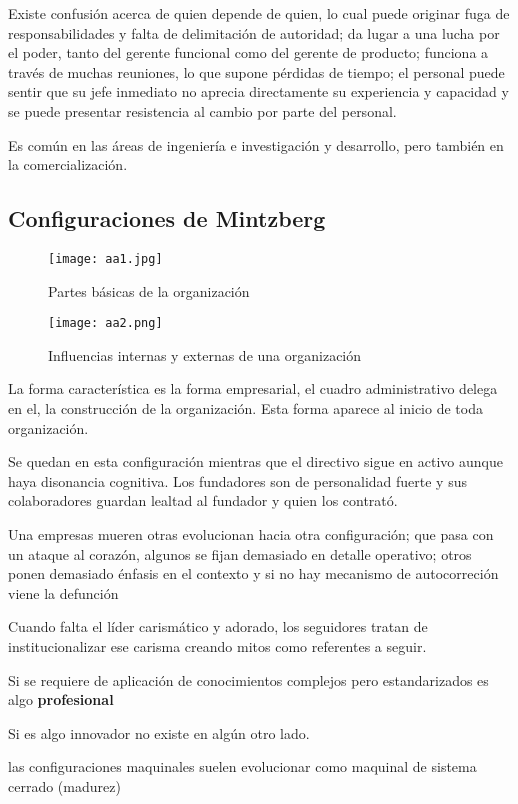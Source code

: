 Existe confusión acerca de quien depende de quien, lo cual puede originar fuga de responsabilidades y falta de delimitación de autoridad; da lugar a una lucha por el poder, tanto del gerente funcional como del gerente de producto; funciona a través de muchas reuniones, lo que supone pérdidas de tiempo; el personal puede sentir que su jefe inmediato no aprecia directamente su experiencia y capacidad y se puede presentar resistencia al cambio por parte del personal.

Es común en las áreas de ingeniería e investigación y desarrollo, pero también en la comercialización.

\subsection{Configuraciones de Mintzberg}
\begin{figure}[h!]
\centering
  \texttt{[image: aa1.jpg]}
  \caption{Partes básicas de la organización}
  \label{aa1jpg}
\end{figure}

\begin{figure}[h!]
\centering
  \texttt{[image: aa2.png]}
  \caption{Influencias internas y externas de una organización}
  \label{aa2}
\end{figure}
La forma característica es la forma empresarial, el cuadro administrativo delega en el, la construcción de la organización. Esta forma aparece al inicio de toda organización. 

Se quedan en esta configuración mientras que el directivo sigue en activo aunque haya disonancia cognitiva. Los fundadores son de personalidad fuerte y sus colaboradores guardan lealtad al fundador y quien los contrató.

Una empresas mueren otras evolucionan hacia otra configuración; que pasa con un ataque al corazón, algunos se fijan demasiado en detalle operativo; otros ponen demasiado énfasis en el contexto y si no hay mecanismo de autocorreción viene la defunción

Cuando falta el líder carismático y adorado, los seguidores tratan de institucionalizar ese carisma creando mitos como referentes a seguir.

Si se requiere de aplicación de conocimientos complejos pero estandarizados es algo \textbf{profesional}

Si es algo innovador no existe en algún otro lado.

las configuraciones maquinales suelen evolucionar como maquinal de sistema cerrado (madurez)

